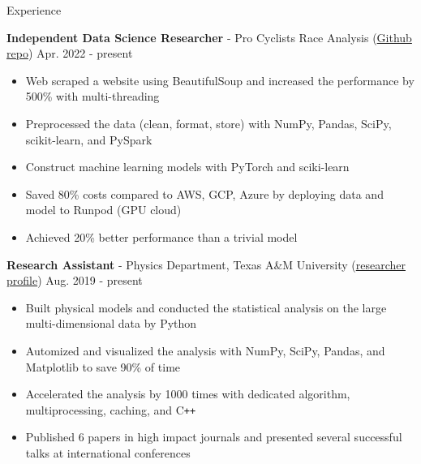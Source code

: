 \documentclass{resume}
\begin{document}
\vspace{-0.25em}
\begin{rSection}{Experience}
    \vspace{-1.5em}
    \item \textbf{Independent Data Science Researcher} - {Pro Cyclists Race Analysis} (\href{https://github.com/noctildon/pro_cyclists}{Github repo}) \hfill Apr. 2022 - present
        \begin{itemize}
        \item Web scraped a website using BeautifulSoup and increased the performance by 500\% with multi-threading
        \item Preprocessed the data (clean, format, store) with NumPy, Pandas, SciPy, scikit-learn, and PySpark
        \item Construct machine learning models with PyTorch and sciki-learn
        \item Saved 80\% costs compared to AWS, GCP, Azure by deploying data and model to Runpod (GPU cloud)
        \item Achieved 20\% better performance than a trivial model
        \end{itemize}

    \item \textbf{Research Assistant} - Physics Department, Texas A\&M University (\href{https://inspirehep.net/authors/2661451}{researcher profile}) \hfill Aug. 2019 - present
        \begin{itemize}
        \item Built physical models and conducted the statistical analysis on the large multi-dimensional data by Python
        \item Automized and visualized the analysis with NumPy, SciPy, Pandas, and Matplotlib to save 90\% of time
        \item Accelerated the analysis by 1000 times with dedicated algorithm, multiprocessing, caching, and C\texttt{++}
        \item Published 6 papers in high impact journals and presented several successful talks at international conferences
        \end{itemize}


\end{rSection}
\end{document}
